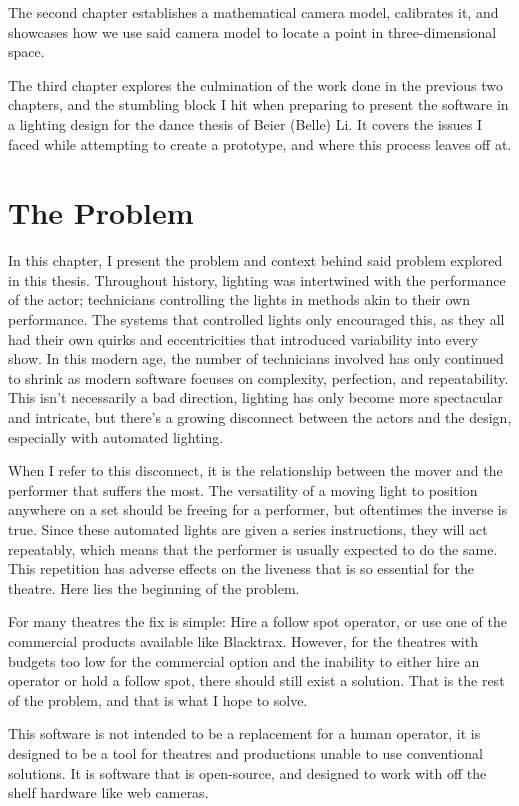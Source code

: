 \documentclass[
    12pt,
    twoside,
    bibstyle=chicago,
    headerstyle=uppercase,
	bibfile=biblatex_updating.bib
]{reedthesis}
\begin{document}
The second chapter establishes a mathematical camera model, calibrates it, and showcases how we use said camera model to locate a point in three-dimensional space.

The third chapter explores the culmination of the work done in the previous two chapters, and the stumbling block I hit when preparing to present the software in a lighting design for the dance thesis of Beier (Belle) Li. It covers the issues I faced while attempting to create a prototype, and where this process leaves off at.

\chapter{The Problem}

In this chapter, I present the problem and context behind said problem explored in this thesis. Throughout history, lighting was intertwined with the performance of the actor; technicians controlling the lights in methods akin to their own performance. The systems that controlled lights only encouraged this, as they all had their own quirks and eccentricities that introduced variability into every show. In this modern age, the number of technicians involved has only continued to shrink as modern software focuses on complexity, perfection, and repeatability. This isn't necessarily a bad direction, lighting has only become more spectacular and intricate, but there's a growing disconnect between the actors and the design, especially with automated lighting. 

When I refer to this disconnect, it is the relationship between the mover and the performer that suffers the most. The versatility of a moving light to position anywhere on a set should be freeing for a performer, but oftentimes the inverse is true. Since these automated lights are given a series instructions, they will act repeatably, which means that the performer is usually expected to do the same. This repetition has adverse effects on the liveness that is so essential for the theatre. Here lies the beginning of the problem.

For many theatres the fix is simple: Hire a follow spot operator, or use one of the commercial products available like Blacktrax. However, for the theatres with budgets too low for the commercial option and the inability to either hire an operator or hold a follow spot, there should still exist a solution. That is the rest of the problem, and that is what I hope to solve.

This software is not intended to be a replacement for a human operator, it is designed to be a tool for theatres and productions unable to use conventional solutions. It is software that is open-source, and designed to work with off the shelf hardware like web cameras.
\end{document}
